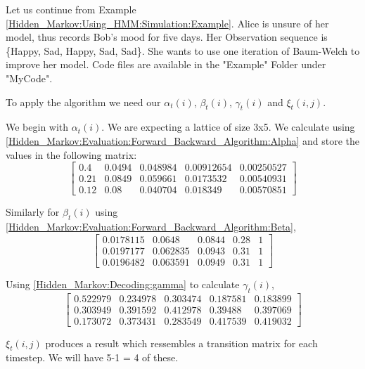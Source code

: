     \begin{example}
        Let us continue from Example \ref{Hidden_Markov:Using_HMM:Simulation:Example}. Alice is unsure of her model, thus records Bob's mood for five days. Her Observation sequence is \{Happy, Sad, Happy, Sad, Sad\}. She wants to use one iteration of Baum-Welch to improve her model. Code files are available in the "Example" Folder under "MyCode".

        To apply the algorithm we need our $\alpha_t(i)$, $\beta_t(i)$, $\gamma_t(i)$ and $\xi_t(i,j)$. 

        We begin with $\alpha_t(i)$. We are expecting a lattice of size 3x5. We calculate using \ref{Hidden_Markov:Evaluation:Forward_Backward_Algorithm:Alpha} and store the values in the following matrix:
        \[
            \begin{bmatrix}
                0.4  &  0.0494  & 0.048984 & 0.00912654 &  0.00250527 \\ 
                0.21 &  0.0849  & 0.059661 & 0.0173532  &  0.00540931 \\
                0.12 &  0.08    & 0.040704 & 0.018349   & 0.00570851  
            \end{bmatrix}
        \]
        
        Similarly for $\beta_t(i)$ using \ref{Hidden_Markov:Evaluation:Forward_Backward_Algorithm:Beta},
        \[
            \begin{bmatrix}
                0.0178115 & 0.0648   & 0.0844 & 0.28  & 1 \\
                0.0197177 & 0.062835 & 0.0943 & 0.31 &  1 \\
                0.0196482 & 0.063591 & 0.0949 & 0.31 & 1 
            \end{bmatrix}
        \]
        
        Using \ref{Hidden_Markov:Decoding:gamma} to calculate $\gamma_t(i)$,
        \[
            \begin{bmatrix}
                0.522979 & 0.234978 & 0.303474 & 0.187581 &  0.183899 \\ 
                0.303949 & 0.391592 & 0.412978 & 0.39488  & 0.397069  \\
                0.173072 & 0.373431 & 0.283549 & 0.417539 &  0.419032 
            \end{bmatrix}
        \]

        $\xi_t(i,j)$ produces a result which ressembles a transition matrix for each timestep. We will have 5-1 = 4 of these.


\end{example}
